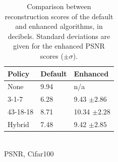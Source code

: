 \begin{table}[h]
        \centering
        \begin{tabular}{|l|ll|}
            \hline
            \textbf{Policy} & \textbf{Default} & \textbf{Enhanced} \\ \hline
            None            & 9.94             & n/a               \\
            3-1-7           & 6.28             & 9.43 $\pm 2.86$   \\
            43-18-18        & 8.71             & 10.34      $\pm 2.28$   \\
            Hybrid          & 7.48             & 9.42   $\pm 2.85$    \\ \hline

        \end{tabular}\\
        \vspace{7pt}
        \footnotesize {PSNR, Cifar100}
    \caption{ Comparison between reconstruction scores of the default and enhanced algorithms, in decibels. Standard deviations are given for the enhanced PSNR scores ($\pm \sigma$). }\label{tab:erpsnr}
    \label{tab:psnrdefenh}
\end{table}

